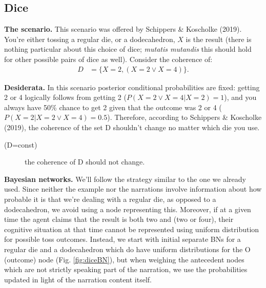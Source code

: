 \documentclass[
  10pt,
]{scrartcl}
\newcommand{\s}[1]{\textsf{#1}}
\begin{document}
\hypertarget{dice}{%
\subsection{Dice}\label{dice}}

\textbf{The scenario.} This scenario was offered by Schippers \& Koscholke (2019). You're either tossing a regular die, or a dodecahedron, \(X\) is the result (there is nothing particular about this choice of dice; \emph{mutatis mutandis} this should hold for other possible pairs of dice as well). Consider the coherence of:
\begin{align*} D &= \{X=2, (X=2\vee X=4)\}.\end{align*}

\noindent \textbf{Desiderata.} In this scenario posterior conditional probabilities are fixed: getting 2 or 4 logically follows from getting 2 (\(P(X=2\vee X=4|X=2)=1\)), and you always have 50\% chance to get 2 given that the outcome was 2 or 4 (\(P(X=2|X=2\vee X=4)=0.5\)). Therefore, according to Schippers \& Koscholke (2019), the coherence of the set \s{D} shouldn't change no matter which die you use.

\vspace{2mm}\begin{description}
    \item[(\s{D=const})] the coherence of \s{D} should not change.
\end{description}\vspace{2mm}

\textbf{Bayesian networks.} We'll follow the strategy similar to the one we already used. Since neither the example nor the narrations involve information about how probable it is that we're dealing with a regular die, as opposed to a dodecahedron, we avoid using a node representing this. Moreover, if at a given time the agent claims that the result is both two and (two or four), their cognitive situation at that time cannot be represented using uniform distribution for possible toss outcomes. Instead, we start with initial separate BNs for a regular die and a dodecahedron which do have uniform distributions for the \textsf{O} (outcome) node (Fig. \ref{fig:diceBN}), but when weighing the antecedent nodes which are not strictly speaking part of the narration, we use the probabilities updated in light of the narration content itself.
\end{document}

